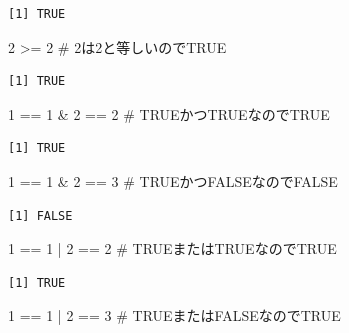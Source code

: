 \documentclass[
  letterpaper,
  DIV=11,
  numbers=noendperiod]{scrreprt}
\newenvironment{Shaded}{\begin{snugshade}}{\end{snugshade}}
\newcommand{\CommentTok}[1]{\textcolor[rgb]{0.37,0.37,0.37}{#1}}
\newcommand{\DecValTok}[1]{\textcolor[rgb]{0.68,0.00,0.00}{#1}}
\newcommand{\SpecialCharTok}[1]{\textcolor[rgb]{0.37,0.37,0.37}{#1}}
\begin{document}
\begin{verbatim}
[1] TRUE
\end{verbatim}

\begin{Shaded}
\begin{Highlighting}[]
\DecValTok{2} \SpecialCharTok{\textgreater{}=} \DecValTok{2} \CommentTok{\# 2は2と等しいのでTRUE}
\end{Highlighting}
\end{Shaded}

\begin{verbatim}
[1] TRUE
\end{verbatim}

\begin{Shaded}
\begin{Highlighting}[]
\DecValTok{1} \SpecialCharTok{==} \DecValTok{1} \SpecialCharTok{\&} \DecValTok{2} \SpecialCharTok{==} \DecValTok{2} \CommentTok{\# TRUEかつTRUEなのでTRUE}
\end{Highlighting}
\end{Shaded}

\begin{verbatim}
[1] TRUE
\end{verbatim}

\begin{Shaded}
\begin{Highlighting}[]
\DecValTok{1} \SpecialCharTok{==} \DecValTok{1} \SpecialCharTok{\&} \DecValTok{2} \SpecialCharTok{==} \DecValTok{3} \CommentTok{\# TRUEかつFALSEなのでFALSE}
\end{Highlighting}
\end{Shaded}

\begin{verbatim}
[1] FALSE
\end{verbatim}

\begin{Shaded}
\begin{Highlighting}[]
\DecValTok{1} \SpecialCharTok{==} \DecValTok{1} \SpecialCharTok{|} \DecValTok{2} \SpecialCharTok{==} \DecValTok{2} \CommentTok{\# TRUEまたはTRUEなのでTRUE}
\end{Highlighting}
\end{Shaded}

\begin{verbatim}
[1] TRUE
\end{verbatim}

\begin{Shaded}
\begin{Highlighting}[]
\DecValTok{1} \SpecialCharTok{==} \DecValTok{1} \SpecialCharTok{|} \DecValTok{2} \SpecialCharTok{==} \DecValTok{3} \CommentTok{\# TRUEまたはFALSEなのでTRUE}
\end{Highlighting}
\end{Shaded}
\end{document}
